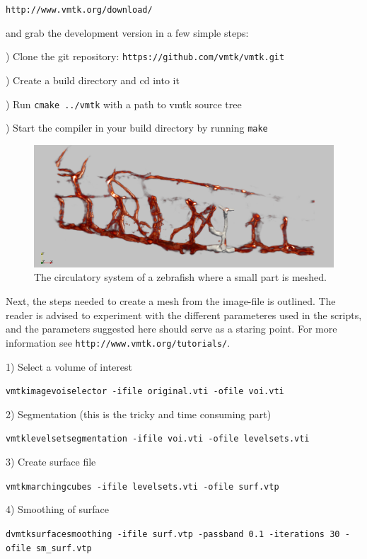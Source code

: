\documentclass[epsfig,11pt]{article}
\begin{document}
\texttt{http://www.vmtk.org/download/}

and grab the development version in a few simple steps:

) Clone the git repository: \texttt{https://github.com/vmtk/vmtk.git}

) Create a build directory and cd into it

) Run \texttt{cmake ../vmtk} with a path to vmtk source tree

) Start the compiler in your build directory by running \texttt{make}

 \begin{figure}[h!] 
\begin{center}
  \includegraphics[scale=0.3]{overview2.png}
  \end{center}
  \caption{The circulatory system of a zebrafish where a small part is meshed.}
\end{figure}

Next, the steps needed to create a mesh from the image-file is outlined. The reader is advised to experiment with the different parameteres used in the scripts, and the parameters suggested here should serve as a staring point. For more information see \texttt{http://www.vmtk.org/tutorials/}.



1) Select a volume of interest
\begin{framed}       
    \texttt{vmtkimagevoiselector -ifile original.vti -ofile voi.vti}
\end{framed}
2) Segmentation (this is the tricky and time consuming part)
\begin{framed}       
    \texttt{vmtklevelsetsegmentation -ifile voi.vti -ofile levelsets.vti}
\end{framed}
3) Create surface file
\begin{framed}       
    \texttt{vmtkmarchingcubes -ifile levelsets.vti -ofile surf.vtp}
\end{framed}
4) Smoothing of surface
\begin{framed}       
    \texttt{dvmtksurfacesmoothing -ifile surf.vtp -passband 0.1 -iterations 30 -ofile sm\_surf.vtp}
\end{framed}
\end{document}
